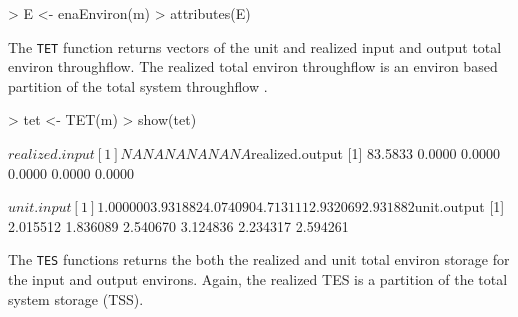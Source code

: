 \documentclass[article]{jss}
\begin{document}
\begin{Schunk}
\begin{Sinput}
> E <- enaEnviron(m)
> attributes(E)
\end{Sinput}
\end{Schunk}

The \texttt{TET} function returns vectors of the unit and realized
input and output total environ throughflow.  The realized total
environ throughflow is an environ based partition of the total system
throughflow \citep{whipple07}.

\begin{Schunk}
\begin{Sinput}
> tet <- TET(m)
> show(tet)
\end{Sinput}
\begin{Soutput}
$realized.input
[1] NA NA NA NA NA NA

$realized.output
[1] 83.5833  0.0000  0.0000  0.0000  0.0000  0.0000

$unit.input
[1] 1.000000 3.931882 4.074090 4.713111 2.932069 2.931882

$unit.output
[1] 2.015512 1.836089 2.540670 3.124836 2.234317 2.594261
\end{Soutput}
\end{Schunk}

The \texttt{TES} functions returns the both the realized and unit
total environ storage for the input and output environs.  Again, the
realized TES is a partition of the total system storage (TSS).
\end{document}
